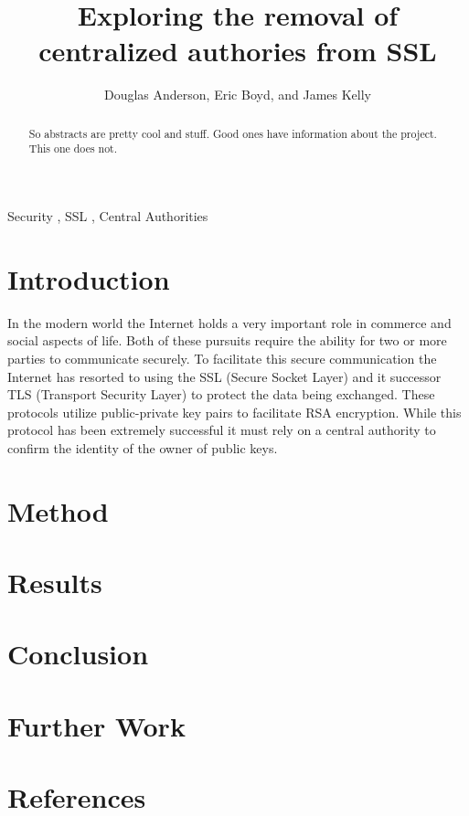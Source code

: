 \documentclass[final,3p,12pt]{elsarticle}
\begin{document}
\begin{frontmatter}

\title{Exploring the removal of centralized authories from SSL}


\author[ryan,doug,oliver]{Douglas Anderson, Eric Boyd, and James Kelly}
\address[doug]{dander01@uoguelph.ca}
\address[eric]{epboyd@gmail.com}
\address[james]{kellyj@uoguelph.ca}


\begin{abstract}

    So abstracts are pretty cool and stuff. Good ones have information about
    the project. This one does not.

\end{abstract}

\begin{keyword}
Security \sep
SSL \sep
Central Authorities
\end{keyword}

\end{frontmatter}

\section{Introduction}
\label{intro}

In the modern world the Internet holds a very important role in commerce and
social aspects of life. Both of these pursuits require the ability for two or
more parties to communicate securely. To facilitate this secure communication
the Internet has resorted to using the SSL (Secure Socket Layer) and it
successor TLS (Transport Security Layer) to protect the data being exchanged.
These protocols utilize public-private key pairs to facilitate RSA encryption.
While this protocol has been extremely successful it must rely on a central
authority to confirm the identity of the owner of public keys.


\section{Method}
\label{Method}

\section{Results}
\label{results}


\section{Conclusion}
\label{conclusion}



\section{Further Work}
\label{further work}


\section{References}
\label{references}
\nocite{*}


\end{document}
